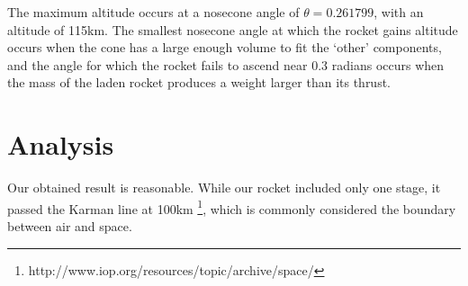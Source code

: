 \documentclass[]{article}
\begin{document}
The maximum altitude occurs at a nosecone angle of $\theta = 0.261799$, with an altitude of 115km. The smallest nosecone angle at which the rocket gains altitude occurs when the cone has a large enough volume to fit the `other' components, and the angle for which the rocket fails to ascend near 0.3 radians occurs when the mass of the laden rocket produces a weight larger than its thrust.

\section{Analysis}

Our obtained result is reasonable. While our rocket included only one stage, it passed the Karman line at 100km \footnote{http://www.iop.org/resources/topic/archive/space/}, which is commonly considered the boundary between air and space. 
\end{document}
